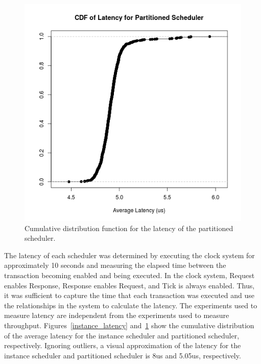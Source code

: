 \begin{figure}
\center
\includegraphics[width=\textwidth]{partitioned_latency_cdf.png}
\caption{Cumulative distribution function for the latency of the partitioned scheduler. \label{partitioned_latency}}
\end{figure}

The latency of each scheduler was determined by executing the clock system for approximately 10 seconds and measuring the elapsed time between the transaction becoming enabled and being executed.
In the clock system, Request enables Response, Response enables Request, and Tick is always enabled.
Thus, it was sufficient to capture the time that each transaction was executed and use the relationships in the system to calculate the latency.
The experiments used to measure latency are independent from the experiments used to measure throughput.
Figures~\ref{instance_latency} and~\ref{partitioned_latency} show the cumulative distribution of the average latency for the instance scheduler and partitioned scheduler, respectively.
Ignoring outliers, a visual approximation of the latency for the instance scheduler and partitioned scheduler is 8us and 5.05us, respectively.


